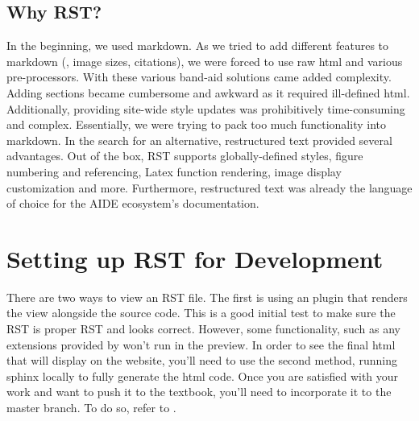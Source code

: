 \documentclass[letterpaper,10pt,english]{sphinxmanual}
\begin{document}
\subsection{Why RST?}
\label{\detokenize{Textbook_Creation_Help/rst_intro:why-rst}}\label{\detokenize{Textbook_Creation_Help/rst_intro:heading-why-rst}}
In the beginning, we used markdown. As we tried to add different features to markdown (, image sizes, citations), we were forced to use raw html and various pre-processors. With these various band-aid solutions came added complexity. Adding sections became cumbersome and awkward as it required ill-defined html. Additionally, providing site-wide style updates was prohibitively time-consuming and complex. Essentially, we were trying to pack too much functionality into markdown. In the search for an alternative, restructured text provided several advantages. Out of the box, RST supports globally-defined styles, figure numbering and referencing, Latex function rendering, image display customization and more. Furthermore, restructured text was already the language of choice for the AIDE ecosystem’s documentation.


\section{Setting up RST for Development}
\label{\detokenize{Textbook_Creation_Help/rst_intro:setting-up-rst-for-development}}\label{\detokenize{Textbook_Creation_Help/rst_intro:heading-setting-up-rst}}
There are two ways to  view an RST file. The first is using an  plugin that renders the view alongside the source code. This is a good initial test to make sure the RST is proper RST and looks  correct. However, some functionality, such as any extensions provided by  won’t run in the preview. In order to see the final html that will display on the website, you’ll need to use the second method, running sphinx locally to fully generate the html code. Once you are satisfied with your work and want to push it to the textbook, you’ll need to incorporate it to the master branch. To do so, refer to {\hyperref[\detokenize{Textbook_Creation_Help/rst_intro:publishing-online}]{}}.
\end{document}
